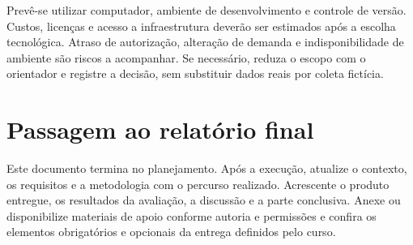 Prevê-se utilizar computador, ambiente de desenvolvimento e controle de versão.
Custos, licenças e acesso a infraestrutura deverão ser estimados após a escolha
tecnológica. Atraso de autorização, alteração de demanda e indisponibilidade
de ambiente são riscos a acompanhar. Se necessário, reduza o escopo com o
orientador e registre a decisão, sem substituir dados reais por coleta fictícia.

\section{Passagem ao relatório final}

Este documento termina no planejamento. Após a execução, atualize o contexto,
os requisitos e a metodologia com o percurso realizado. Acrescente o produto
entregue, os resultados da avaliação, a discussão e a parte conclusiva. Anexe
ou disponibilize materiais de apoio conforme autoria e permissões e confira
os elementos obrigatórios e opcionais da entrega definidos pelo curso.
